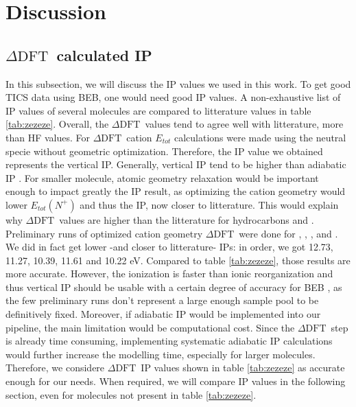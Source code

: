 \documentclass[article,preview]{planetary}
\newcommand{\dft}{\ensuremath{\Delta\textrm{DFT}}}
\begin{document}





\section{Discussion}

\subsection{\dft~calculated IP}
In this subsection, we will discuss the IP values we used in this work. To get good TICS data using BEB, one
 would need good IP values. A non-exhaustive list of IP values of several molecules are compared to litterature values in table \ref{tab:zezeze}. Overall, the \dft~values tend to agree well with litterature, more than HF values. For \dft~cation $E_{tot}$ calculations were made using the neutral specie without geometric optimization. Therefore, the IP value we obtained represents the vertical IP. Generally, vertical IP tend to be higher than adiabatic IP \parencite{lealInteractionGoldSilver2015,stewartMachineLearningIonization2023,bingSpinOrbitInitio2008,aliElectronimpactTotalIonization1997}. For smaller molecule, atomic geometry relaxation would be important enough to impact greatly the IP result, as optimizing the cation geometry would lower $E_{tot}(N^+)$ and thus the IP, now closer to litterature. This would explain why \dft~values are higher than the litterature for  hydrocarbons and . Preliminary runs of optimized cation geometry \dft~were done for , , ,  and . We did in fact get lower -and closer to litterature- IPs: in order, we got  12.73, 11.27, 10.39, 11.61 and 10.22 eV. Compared to table \ref{tab:zezeze}, those results are more accurate. However, the ionization is faster than ionic reorganization and thus vertical IP should be usable with a certain degree of accuracy for BEB \parencite{aliElectronimpactTotalIonization1997}, as the few preliminary runs don't represent a large enough sample pool to be definitively fixed. Moreover, if adiabatic IP would be implemented into our pipeline,  the main limitation would be computational cost. Since the \dft~step is already time consuming, implementing systematic adiabatic IP calculations would further increase the modelling time, especially for larger molecules. Therefore, we considere \dft~IP values shown in table \ref{tab:zezeze} as accurate enough for our needs. When required, we will compare IP values in the following section, even for molecules not present in table \ref{tab:zezeze}.
\end{document}
